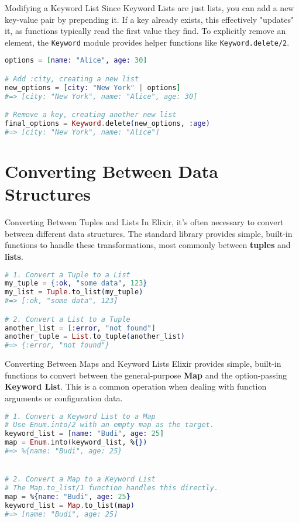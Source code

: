 \documentclass[aspectratio=169, table]{beamer}
\begin{document}
\begin{frame}[fragile]{Modifying a Keyword List}
\vspace{20pt}
Since Keyword Lists are just lists, you can add a new key-value pair by prepending it. If a key already exists, this effectively "updates" it, as functions typically read the first value they find. To explicitly remove an element, the \texttt{Keyword} module provides helper functions like \texttt{Keyword.delete/2}.

\begin{lstlisting}[language=Elixir]
options = [name: "Alice", age: 30]

# Add :city, creating a new list
new_options = [city: "New York" | options]
#=> [city: "New York", name: "Alice", age: 30]

# Remove a key, creating another new list
final_options = Keyword.delete(new_options, :age)
#=> [city: "New York", name: "Alice"]
\end{lstlisting}
\end{frame}

\section{Converting Between Data Structures}

\begin{frame}[fragile]{Converting Between Tuples and Lists}
\vspace{20pt}
In Elixir, it's often necessary to convert between different data structures. The standard library provides simple, built-in functions to handle these transformations, most commonly between \textbf{tuples} and \textbf{lists}.

\begin{lstlisting}[language=Elixir]
# 1. Convert a Tuple to a List
my_tuple = {:ok, "some data", 123}
my_list = Tuple.to_list(my_tuple)
#=> [:ok, "some data", 123]

# 2. Convert a List to a Tuple
another_list = [:error, "not found"]
another_tuple = List.to_tuple(another_list)
#=> {:error, "not found"}
\end{lstlisting}
\end{frame}

\begin{frame}[fragile]{Converting Between Maps and Keyword Lists}
\vspace{20pt}
Elixir provides simple, built-in functions to convert between the general-purpose \textbf{Map} and the option-passing \textbf{Keyword List}. This is a common operation when dealing with function arguments or configuration data.

\begin{lstlisting}[language=Elixir]
# 1. Convert a Keyword List to a Map
# Use Enum.into/2 with an empty map as the target.
keyword_list = [name: "Budi", age: 25]
map = Enum.into(keyword_list, %{})
#=> %{name: "Budi", age: 25}


# 2. Convert a Map to a Keyword List
# The Map.to_list/1 function handles this directly.
map = %{name: "Budi", age: 25}
keyword_list = Map.to_list(map)
#=> [name: "Budi", age: 25]
\end{lstlisting}
\end{frame}
\end{document}

